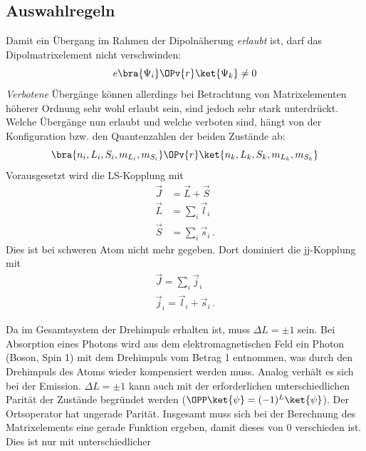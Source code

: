 \subsection{Auswahlregeln}\label{subsec:auswahlregeln}
Damit ein Übergang im Rahmen der Dipolnäherung \textit{erlaubt} ist, darf das
Dipolmatrixelement nicht verschwinden:
\begin{equation}\label{eq:dipolmatrixelement}
	e\bra{\Psi_i}\OPv{r}\ket{\Psi_k}\neq0
\end{equation}
\textit{Verbotene} Übergänge können allerdings bei Betrachtung von
Matrixelementen höherer Ordnung sehr wohl erlaubt sein, sind jedoch sehr stark
unterdrückt. Welche Übergänge nun erlaubt und welche verboten sind, hängt von
der Konfiguration bzw. den Quantenzahlen der beiden Zustände ab:
\begin{equation}\label{eq:dipolmatrixelement_quantenzahlen}
	\bra{n_i,L_i,S_i,m_{L_i}, m_{S_i}}\OPv{r}\ket{n_k,L_k,S_k,m_{L_k}, m_{S_k}}
\end{equation}
Vorausgesetzt wird die LS-Kopplung mit
\begin{equation}\label{eq:LS-Kopplung}
	\begin{split}
		\vec{J}&=\vec{L}+\vec{S}\\
		\vec{L}&=\sum\limits_i\vec{l}_i\\
		\vec{S}&=\sum\limits_i\vec{s}_i\,.
	\end{split}
\end{equation}
Dies ist bei schweren Atom nicht mehr gegeben. Dort dominiert die
jj-Kopplung mit
\begin{equation}\label{eq:jj-Kopplung}
	\begin{split}
		\vec{J}=\sum\limits_i\vec{j}_i\\
		\vec{j}_i=\vec{l}_i+\vec{s}_i\,.
	\end{split}
\end{equation}
\par
Da im Gesamtsystem der Drehimpuls erhalten ist, muss $\Delta L =\pm1$ sein.
Bei Absorption eines Photons wird aus dem elektromagnetischen Feld ein Photon (Boson, Spin 1) mit dem Drehimpuls vom
Betrag 1 entnommen, was durch den Drehimpuls des Atoms wieder kompensiert werden
muss. Analog verhält es sich bei der Emission. $\Delta L =\pm1$ kann auch mit
der erforderlichen unterschiedlichen Parität der Zustände begründet werden
($\OPP\ket{\psi}=(-1)^L\ket{\psi}$). Der Ortsoperator hat ungerade Parität.
Insgesamt muss sich bei der Berechnung des Matrixelements eine gerade Funktion
ergeben, damit dieses von 0 verschieden ist. Dies ist nur mit unterschiedlicher
